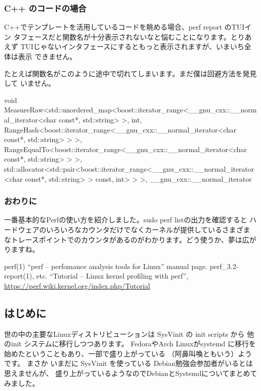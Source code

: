\documentclass[mingoth,a4paper]{jsarticle}
\begin{document}
\subsubsection{C++ のコードの場合}

C++でテンプレートを活用しているコードを眺める場合、perf report のTUIイン
タフェースだと関数名が十分表示されないなと悩むことになります。とりあえず
TUIじゃないインタフェースにするともっと表示されますが、いまいち全体は表示
できません。

たとえば関数名がこのように途中で切れてしまいます。まだ僕は回避方法を発見して
いません。

\begin{commandline}
 void
 MeasureRaw<std::unordered_map<boost::iterator_range<__gnu_cxx::__normal_iterator<char
 const*, std::string> >, int,
 RangeHash<boost::iterator_range<__gnu_cxx::__normal_iterator<char
 const*, std::string> > >,
 RangeEqualTo<boost::iterator_range<__gnu_cxx::__normal_iterator<char
 const*, std::string> > >,
 std::allocator<std::pair<boost::iterator_range<__gnu_cxx::__normal_iterator<char
 const*, std::string> > const, int> > >, __gnu_cxx::__normal_iterator
\end{commandline}

\subsubsection{おわりに}

一番基本的なPerfの使い方を紹介しました。sudo perf listの出力を確認すると
ハードウェアのいろいろなカウンタだけでなくカーネルが提供しているさまざま
なトレースポイントでのカウンタがあるのがわかります。どう使うか、夢は広が
りますね。

\begin{thebibliography}{98}
  perf(1) ``perf -- perfomance analysis tools for Linux''
	 manual page. perf\_{}3.2-report(1), etc.
 ``Tutorial -- Linux kernel profiling with
	perf'', 
	\url{https://perf.wiki.kernel.org/index.php/Tutorial}

\end{thebibliography}


\subsection{はじめに}
世の中の主要なLinuxディストリビューションは SysVinit の init scripts から
他のinit システムに移行しつつあります。
FedoraやArch Linuxがsystemd に移行を始めたということもあり、一部で盛り上がっている
（阿鼻叫喚ともいう）ようです。
まさか いまだに SysVinit を使っている Debian勉強会参加者がいるとは思えませんが、
盛り上がっているようなのでDebianとSystemdについてまとめてみました。
\end{document}
